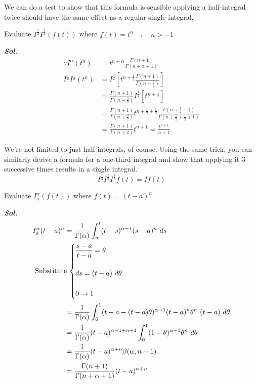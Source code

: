 \newpage
We can do a test to show that this formula is sensible applying a 
half-integral twice should have the same effect as a regular single integral.
\begin{example}
    Evaluate $I^{\frac{1}{2}}I^{\frac{1}{2}}(f(t))$ where $f(t) = t^{n} \quad,\quad n>-1 $ 
    
    \textit{ \textbf{Sol.} }
    \begin{align*}
        \because I^{\alpha}(t^{n}) &=  t^{n+\alpha}\frac{\Gamma{(n+1)} } {\Gamma{(n+\alpha+1)} }
        \\
        I^{\frac{1}{2}}I^{\frac{1}{2}}(t^{n}) &=  I^{\frac{1}{2}}\left[ t^{n+\frac{1}{2}}\frac{\Gamma{(n+1)} } {\Gamma{(n+\frac{3}{2})} }\right]
        \\
        &=  \frac{\Gamma{(n+1)} } {\Gamma{(n+\frac{3}{2})} } I^{\frac{1}{2}}\left[ t^{n+\frac{1}{2}}\right]
        \\
        &= \frac{\Gamma{(n+1)} } {\Gamma{(n+\frac{3}{2})} } t^{n+\frac{1}{2}+\frac{1}{2}}\frac{\Gamma{(n+\frac{1}{2}+1)} } {\Gamma{(n+\frac{1}{2}+\frac{1}{2}+1)} } 
        \\
        &= \frac{\Gamma{(n+1)} }{\Gamma{(n+2)}} t^{n+1} = \frac{t^{n+1}}{n+1} 
    \end{align*}
\end{example}
We're not limited to just half-integrals, of course.  
Using the same trick, you can similarly derive a formula for a one-third integral  
and show that applying it 3 successive times results in a single integral.
\[
    I^{\frac{1}{3}}I^{\frac{1}{3}}I^{\frac{1}{3}}f(t) = If(t)
\]
\begin{example}
    Evaluate $I_a^{\alpha}(f(t))$ where $f(t) = (t-a)^{n}$

    \textit{ \textbf{Sol.} }
    \begin{align*}
        I_a^{\alpha}(t-a)^{n} &= \frac{1}{\Gamma{(\alpha)}} \int_a^t (t-s)^{\alpha-1} (s-a)^n \,\, ds
        \\
        \intertext{
            Substitute
    \(
    \begin{cases}
        \displaystyle \frac{s-a}{t-a} = \theta
        \\\\
        \displaystyle ds=(t-a) \,\,d\theta
        \\\\
        \displaystyle 0 \to 1
    \end{cases}
    \)
        }
        &=  \frac{1}{\Gamma{(\alpha)}} \int_0^1 (t-a-(t-a)\theta)^{\alpha-1} (t-a)^n \theta^n  \,\, (t-a) \,\, d\theta    
        \\
        &=  \frac{1}{\Gamma{(\alpha)}} (t-a)^{\alpha-1+n+1}\int_0^1 (1-\theta)^{\alpha-1} \theta^n  \,\, d\theta    
        \\
        &=  \frac{1}{\Gamma{(\alpha)}} (t-a)^{\alpha+n}\beta{(\alpha,n+1)}
        \\
        &= \frac{\Gamma{(n+1)} }{\Gamma{(n+\alpha+1)}} (t-a)^{\alpha+n}
    \end{align*}
\end{example}
